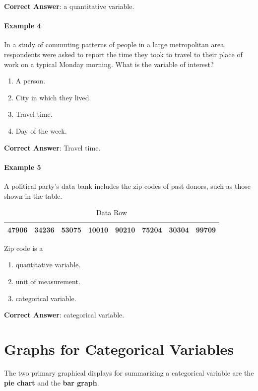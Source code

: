 \textbf{Correct Answer}: a quantitative variable.

\paragraph{Example 4}
In a study of commuting patterns of people in a large metropolitan area, respondents were asked to report the time they took to travel to their place of work on a typical Monday morning. What is the variable of interest?
\begin{enumerate}[label=\alph*.]
    \item A person.
    \item City in which they lived.
    \item Travel time.
    \item Day of the week.
\end{enumerate}

\textbf{Correct Answer}: Travel time.

\paragraph{Example 5}
A political party's data bank includes the zip codes of past donors, such as those shown in the table. 

\begin{table}[h!]
\centering
\begin{tabular}{|c|c|c|c|c|c|c|c|}
\hline
47906 & 34236 & 53075 & 10010 & 90210 & 75204 & 30304 & 99709 \\ \hline
\end{tabular}
\caption{Data Row}
\label{tab:zip_code}
\end{table}

Zip code is a 

\begin{enumerate}[label=\alph*.]
    \item quantitative variable.
    \item unit of measurement.
    \item categorical variable.
\end{enumerate}

\textbf{Correct Answer}: categorical variable.

\section{Graphs for Categorical Variables}
The two primary graphical displays for summarizing a categorical variable are the \textbf{pie chart} and the \textbf{bar graph}.

